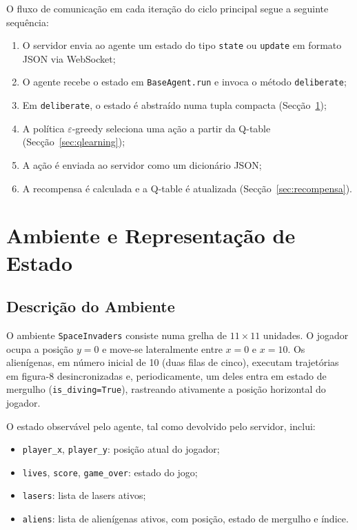 \documentclass[12pt,a4paper]{article}
\begin{document}
O fluxo de comunicação em cada iteração do ciclo principal segue a seguinte sequência:

\begin{enumerate}
    \item O servidor envia ao agente um estado do tipo \texttt{state} ou \texttt{update} em formato JSON via WebSocket;
    \item O agente recebe o estado em \texttt{BaseAgent.run} e invoca o método \texttt{deliberate};
    \item Em \texttt{deliberate}, o estado é abstraído numa tupla compacta (Secção~\ref{sec:estado});
    \item A política $\varepsilon$-greedy seleciona uma ação a partir da Q-table (Secção~\ref{sec:qlearning});
    \item A ação é enviada ao servidor como um dicionário JSON;
    \item A recompensa é calculada e a Q-table é atualizada (Secção~\ref{sec:recompensa}).
\end{enumerate}

\section{Ambiente e Representação de Estado}
\label{sec:estado}

\subsection{Descrição do Ambiente}

O ambiente \texttt{SpaceInvaders} consiste numa grelha de $11 \times 11$ unidades. O jogador ocupa a posição $y=0$ e move-se lateralmente entre $x=0$ e $x=10$. Os alienígenas, em número inicial de 10 (duas filas de cinco), executam trajetórias em figura-8 desincronizadas e, periodicamente, um deles entra em estado de mergulho (\texttt{is\_diving=True}), rastreando ativamente a posição horizontal do jogador.

O estado observável pelo agente, tal como devolvido pelo servidor, inclui:

\begin{itemize}
    \item \texttt{player\_x}, \texttt{player\_y}: posição atual do jogador;
    \item \texttt{lives}, \texttt{score}, \texttt{game\_over}: estado do jogo;
    \item \texttt{lasers}: lista de lasers ativos;
    \item \texttt{aliens}: lista de alienígenas ativos, com posição, estado de mergulho e índice.
\end{itemize}
\end{document}
